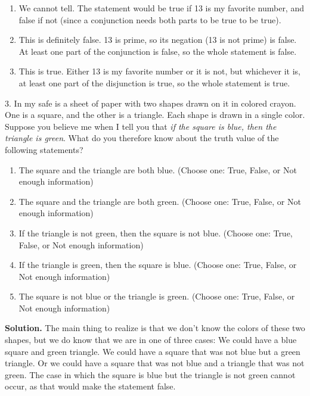 \documentclass[10pt,]{book}
\theoremstyle{plain}
\theoremstyle{definition}
\theoremstyle{definition}
\numberwithin{equation}{chapter}
\begin{document}
\begin{exerciselist}
\begin{enumerate}[label=(\alph*)]
\item\hypertarget{li-84}{}\hypertarget{p-183}{}%
We cannot tell.  The statement would be true if 13 is my favorite number, and false if not (since a conjunction needs both parts to be true to be true).%
\item\hypertarget{li-85}{}\hypertarget{p-184}{}%
This is definitely false.  13 is prime, so its negation (13 is not prime) is false.  At least one part of the conjunction is false, so the whole statement is false.%
\item\hypertarget{li-86}{}\hypertarget{p-185}{}%
This is true.  Either 13 is my favorite number or it is not, but whichever it is, at least one part of the disjunction is true, so the whole statement is true.%
\end{enumerate}
%
\par
\item[3.]\hypertarget{exercise-3}{}\noindent%
\hypertarget{p-186}{}%
In my safe is a sheet of paper with two shapes drawn on it in colored crayon.  One is a square, and the other is a triangle.  Each shape is drawn in a single color.  Suppose you believe me when I tell you that \emph{if the square is blue, then the triangle is green}.  What do you therefore know about the truth value of the following statements?%
\par
\hypertarget{p-187}{}%
\leavevmode%
\begin{enumerate}[label=(\alph*)]
\item\hypertarget{li-87}{}\hypertarget{p-188}{}%
The square and the triangle are both blue.  (Choose one: True, False, or Not enough information)%
\item\hypertarget{li-88}{}\hypertarget{p-189}{}%
The square and the triangle are both green. (Choose one: True, False, or Not enough information)%
\item\hypertarget{li-89}{}\hypertarget{p-190}{}%
If the triangle is not green, then the square is not blue. (Choose one: True, False, or Not enough information)%
\item\hypertarget{li-90}{}\hypertarget{p-191}{}%
If the triangle is green, then the square is blue. (Choose one: True, False, or Not enough information)%
\item\hypertarget{li-91}{}\hypertarget{p-192}{}%
The square is not blue or the triangle is green. (Choose one: True, False, or Not enough information)%
\end{enumerate}
%
\par
\medskip\noindent%
\textbf{Solution.}\quad \hypertarget{p-193}{}%
The main thing to realize is that we don't know the colors of these two shapes, but we do know that we are in one of three cases: We could have a blue square and green triangle.  We could have a square that was not blue but a green triangle.  Or we could have a square that was not blue and a triangle that was not green.  The case in which the square is blue but the triangle is not green cannot occur, as that would make the statement false.%

\end{exerciselist}
\end{document}
